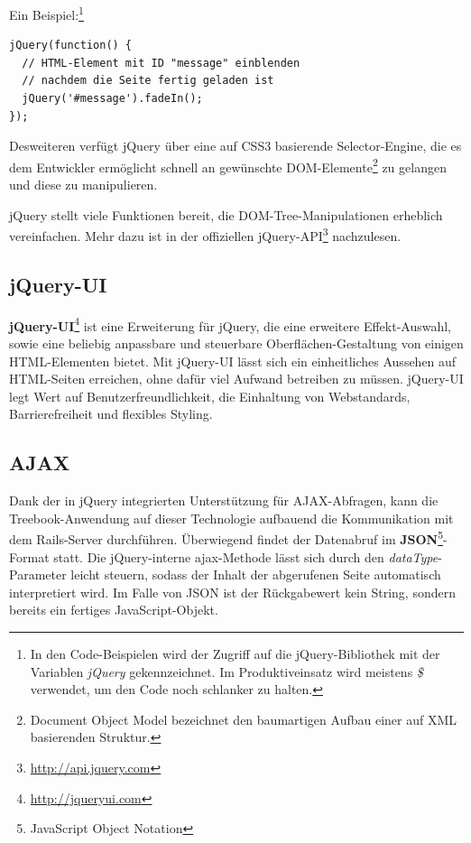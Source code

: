 \documentclass[10pt,a4paper]{book}
\begin{document}
Ein Beispiel:\footnote{In den Code-Beispielen wird der Zugriff auf die jQuery-Bibliothek mit der Variablen \textit{jQuery} gekennzeichnet. Im Produktiveinsatz wird meistens \textit{\$} verwendet, um den Code noch schlanker zu halten.}

\begin{lstlisting}
jQuery(function() {
  // HTML-Element mit ID "message" einblenden
  // nachdem die Seite fertig geladen ist
  jQuery('#message').fadeIn();
});
\end{lstlisting}

Desweiteren verfügt jQuery über eine auf CSS3 basierende Selector-Engine, die es dem Entwickler ermöglicht schnell an gewünschte DOM-Elemente\footnote{Document Object Model bezeichnet den baumartigen Aufbau einer auf XML basierenden Struktur.} zu gelangen und diese zu manipulieren.

jQuery stellt viele Funktionen bereit, die DOM-Tree-Manipulationen erheblich vereinfachen. Mehr dazu ist in der offiziellen jQuery-API\footnote{\href{http://api.jquery.com}{http://api.jquery.com}} nachzulesen.

\subsection{jQuery-UI}
\textbf{jQuery-UI}\footnote{\href{http://jqueryui.com}{http://jqueryui.com}} ist eine Erweiterung für jQuery, die eine erweitere Effekt-Auswahl, sowie eine beliebig anpassbare und steuerbare Oberflächen-Gestaltung von einigen HTML-Elementen bietet.
Mit jQuery-UI lässt sich ein einheitliches Aussehen auf HTML-Seiten erreichen, ohne dafür viel Aufwand betreiben zu müssen. jQuery-UI legt Wert auf Benutzerfreundlichkeit, die Einhaltung von Webstandards, Barrierefreiheit und flexibles Styling.

\subsection{AJAX}
Dank der in jQuery integrierten Unterstützung für AJAX-Abfragen, kann die Treebook-Anwendung auf dieser Technologie aufbauend die Kommunikation mit dem Rails-Server durchführen.
Überwiegend findet der Datenabruf im \textbf{JSON}\footnote{JavaScript Object Notation}-Format statt. Die jQuery-interne ajax-Methode lässt sich durch den \textit{dataType}-Parameter leicht steuern, sodass der Inhalt der abgerufenen Seite automatisch interpretiert wird. Im Falle von JSON ist der Rückgabewert kein String, sondern bereits ein fertiges JavaScript-Objekt.
\end{document}
